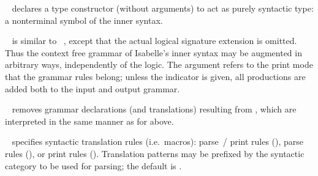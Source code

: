\begin{isabellebody}
\begin{isamarkuptext}
  \begin{description}
  
  \item \hyperlink{command.nonterminal}{\mbox{}}~ declares a type
  constructor  (without arguments) to act as purely syntactic
  type: a nonterminal symbol of the inner syntax.

  \item \hyperlink{command.syntax}{\mbox{}}~ is similar to
  \hyperlink{command.consts}{\mbox{}}~, except that the actual logical
  signature extension is omitted.  Thus the context free grammar of
  Isabelle's inner syntax may be augmented in arbitrary ways,
  independently of the logic.  The  argument refers to the
  print mode that the grammar rules belong; unless the \hyperlink{keyword.output}{\mbox{}} indicator is given, all productions are added both to the
  input and output grammar.
  
  \item \hyperlink{command.no-syntax}{\mbox{}}~ removes grammar
  declarations (and translations) resulting from , which
  are interpreted in the same manner as for \hyperlink{command.syntax}{\mbox{}} above.
  
  \item \hyperlink{command.translations}{\mbox{}}~ specifies syntactic
  translation rules (i.e.\ macros): parse~/ print rules (),
  parse rules (), or print rules ().
  Translation patterns may be prefixed by the syntactic category to be
  used for parsing; the default is .
  

\end{description}
\end{isamarkuptext}
\end{isabellebody}
